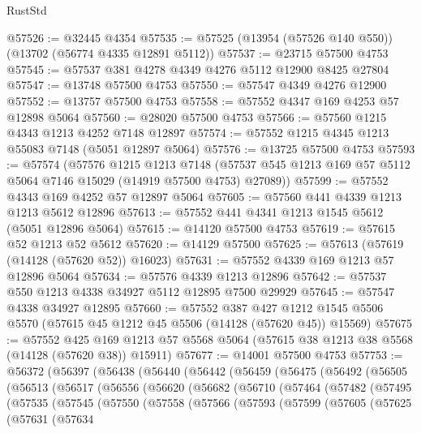 \begin{lexlean}{RustStd}
\begin{coremodule}
@57526 := @32445 @4354
@57535 := @57525 (@13954 (@57526 @140 @550)) (@13702 (@56774 @4335 @12891 @5112))
@57537 := @23715 @57500 @4753
@57545 := @57537 @381 @4278 @4349 @4276 @5112 @12900 @8425 @27804
@57547 := @13748 @57500 @4753
@57550 := @57547 @4349 @4276 @12900
@57552 := @13757 @57500 @4753
@57558 := @57552 @4347 @169 @4253 @57 @12898 @5064
@57560 := @28020 @57500 @4753
@57566 := @57560 @1215 @4343 @1213 @4252 @7148 @12897
@57574 := @57552 @1215 @4345 @1213 @55083 @7148 (@5051 @12897 @5064)
@57576 := @13725 @57500 @4753
@57593 := @57574
    (@57576
      @1215
      @1213
      @7148
      (@57537 @545 @1213 @169 @57 @5112 @5064 @7146 @15029 (@14919 @57500 @4753) @27089))
@57599 := @57552 @4343 @169 @4252 @57 @12897 @5064
@57605 := @57560 @441 @4339 @1213 @1213 @5612 @12896
@57613 := @57552 @441 @4341 @1213 @1545 @5612 (@5051 @12896 @5064)
@57615 := @14120 @57500 @4753
@57619 := @57615 @52 @1213 @52 @5612
@57620 := @14129 @57500
@57625 := @57613 (@57619 (@14128 (@57620 @52)) @16023)
@57631 := @57552 @4339 @169 @1213 @57 @12896 @5064
@57634 := @57576 @4339 @1213 @12896
@57642 := @57537 @550 @1213 @4338 @34927 @5112 @12895 @7500 @29929
@57645 := @57547 @4338 @34927 @12895
@57660 := @57552
    @387
    @427
    @1212
    @1545
    @5506
    @5570
    (@57615 @45 @1212 @45 @5506 (@14128 (@57620 @45)) @15569)
@57675 := @57552
    @425
    @169
    @1213
    @57
    @5568
    @5064
    (@57615 @38 @1213 @38 @5568 (@14128 (@57620 @38)) @15911)
@57677 := @14001 @57500 @4753
@57753 := @56372
    (@56397
      (@56438
        (@56440
          (@56442
            (@56459
              (@56475
                (@56492
                  (@56505
                    (@56513
                      (@56517
                        (@56556
                          (@56620
                            (@56682
                              (@56710
                                (@57464
                                  (@57482
                                    (@57495
                                      (@57535
                                        (@57545
                                          (@57550
                                            (@57558
                                              (@57566
                                                (@57593
                                                  (@57599
                                                    (@57605
                                                      (@57625
                                                        (@57631
                                                          (@57634

\end{coremodule}
\end{lexlean}
